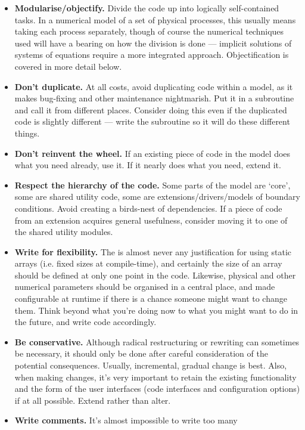 \begin{itemize}
\item \textbf{Modularise/objectify.} Divide the code up into logically self-contained
  tasks. In a numerical model of a set of physical processes, this usually
  means taking each process separately, though of course the numerical
  techniques used will have a bearing on how the division is done --- implicit
  solutions of systems of equations require a more integrated
  approach. Objectification is covered in more detail below.
\item \textbf{Don't duplicate.} At all costs, avoid duplicating code within a
  model, as it makes bug-fixing and other maintenance nightmarish.
  Put it in a subroutine and call it from different places. Consider
  doing this even if the duplicated code is slightly different --- write the
  subroutine so it will do these different things.
\item \textbf{Don't reinvent the wheel.} If an existing piece of code in the
  model does what you need already, use it. If it nearly does what you need,
  extend it.
\item \textbf{Respect the hierarchy of the code.} Some parts of the model are
  `core', some are shared utility code, some are extensions/drivers/models of
  boundary conditions. Avoid creating a birds-nest of dependencies. If a piece
  of code from an extension acquires general usefulness, consider moving it to
  one of the shared utility modules.
\item \textbf{Write for flexibility.} The is almost never any justification
  for using static arrays (i.e. fixed sizes at compile-time), and certainly
  the size of an array should be defined at only one point in the
  code. Likewise, physical and other numerical parameters should be organised
  in a central place, and made configurable at runtime if there is a chance
  someone might want to change them. Think beyond what you're doing now to
  what you might want to do in the future, and write code accordingly.
\item \textbf{Be conservative.} Although radical restructuring or rewriting can
  sometimes be necessary, it should only be done after careful consideration
  of the potential consequences. Usually, incremental, gradual change is
  best. Also, when making changes, it's very important to retain the existing
  functionality and the form of the user interfaces (code interfaces and
  configuration options) if at all possible. Extend rather than alter.
\item \textbf{Write comments.} It's almost impossible to write too many

\end{itemize}
